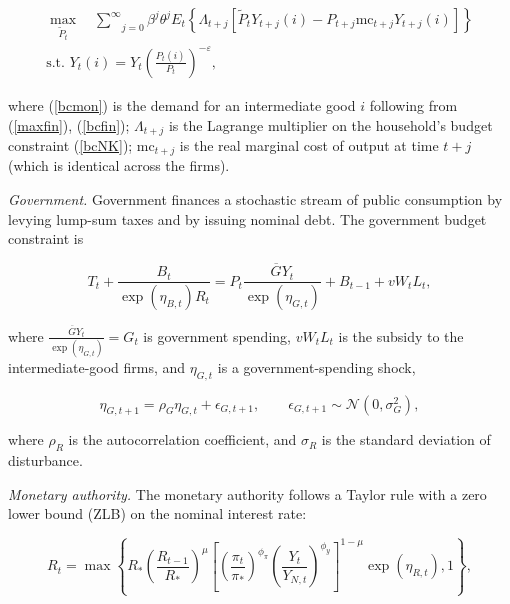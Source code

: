 \begin{gather}
\underset{\widetilde{P}_{t}}{\max }\quad \underset{j=0}{\overset{\infty }{
\mathop{\displaystyle \sum } }}\beta ^{j}\theta ^{j}E_{t}\left \{ \Lambda
_{t+j}\left[ \widetilde{P}_{t}Y_{t+j}\left( i\right) -P_{t+j}\text{mc}
_{t+j}Y_{t+j}\left( i\right) \right] \right \}  \label{maxmon} \\
\text{s.t. }Y_{t}\left( i\right) =Y_{t}\left( \frac{P_{t}\left( i\right) }{
P_{t}}\right) ^{-\varepsilon },  \label{bcmon}
\end{gather}

where (\ref{bcmon}) is the demand for an intermediate good $i$ following from
(\ref{maxfin}), (\ref{bcfin}); $\Lambda _{t+j}$ is the Lagrange multiplier on
the household's budget constraint (\ref{bcNK}); mc$_{t+j}$ is the real marginal
cost of output at time $t+j$ (which is identical across the firms).

\textit{Government. }Government finances a stochastic stream of public
consumption by levying lump-sum taxes and by issuing nominal debt. The
government budget constraint is

\begin{equation}
T_{t}+\frac{B_{t}}{\exp \left( \eta _{B,t}\right) R_{t}}=P_{t}\frac{
\overline{G}Y_{t}}{\exp \left( \eta _{G,t}\right) }+B_{t-1}+vW_{t}L_{t},
\label{Gbc}
\end{equation}

where $\frac{\overline{G}Y_{t}}{\exp \left( \eta _{G,t}\right) }=G_{t}$ is
government spending, $vW_{t}L_{t}$ is the subsidy to the intermediate-good
firms, and $\eta _{G,t}$ is a government-spending shock,

\begin{equation}
\eta _{G,t+1}=\rho _{G}\eta _{G,t}+\epsilon _{G,t+1},\qquad \epsilon
_{G,t+1}\sim \mathcal{N}\left( 0,\sigma _{G}^{2}\right) ,  \label{nuG}
\end{equation}

where $\rho _{R}$ is the autocorrelation coefficient, and $\sigma _{R}$ is the
standard deviation of disturbance.

\textit{Monetary authority. }The monetary authority follows a Taylor rule with
a zero lower bound (ZLB) on the nominal interest rate:

\begin{equation}
R_{t}=\max \left \{ R_{\ast }\left( \frac{R_{t-1}}{R_{\ast }}\right) ^{\mu }
\left[ \left( \frac{\pi _{t}}{\pi _{\ast }}\right) ^{\phi _{\pi }}\left(
\frac{Y_{t}}{Y_{N,t}}\right) ^{\phi _{y}}\right] ^{1-\mu }\exp \left( \eta
_{R,t}\right) ,1\right \} ,  \label{Tr2}
\end{equation}

